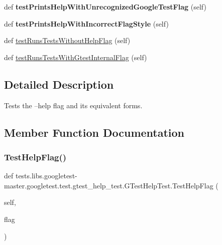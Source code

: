 \begin{DoxyCompactItemize}
def {\bfseries test\+Prints\+Help\+With\+Unrecognized\+Google\+Test\+Flag} (self)
\item 
\mbox{\label{classtests_1_1libs_1_1googletest-master_1_1googletest_1_1test_1_1gtest__help__test_1_1GTestHelpTest_a0c6d51ea37769e7b80b34315f89d1fc4}} 
def {\bfseries test\+Prints\+Help\+With\+Incorrect\+Flag\+Style} (self)
\item 
def \hyperlink{classtests_1_1libs_1_1googletest-master_1_1googletest_1_1test_1_1gtest__help__test_1_1GTestHelpTest_a08c28fbc7aacb80842b29ec41faf3fc8}{test\+Runs\+Tests\+Without\+Help\+Flag} (self)
\item 
def \hyperlink{classtests_1_1libs_1_1googletest-master_1_1googletest_1_1test_1_1gtest__help__test_1_1GTestHelpTest_a5b52935bcda9f8e5aa41c29d38baa161}{test\+Runs\+Tests\+With\+Gtest\+Internal\+Flag} (self)
\end{DoxyCompactItemize}


\subsection{Detailed Description}
\begin{DoxyVerb}Tests the --help flag and its equivalent forms.\end{DoxyVerb}
 

\subsection{Member Function Documentation}
\mbox{\label{classtests_1_1libs_1_1googletest-master_1_1googletest_1_1test_1_1gtest__help__test_1_1GTestHelpTest_a39952f2e367cd1137fb42923e56dcd64}} 
\subsubsection{\texorpdfstring{Test\+Help\+Flag()}{TestHelpFlag()}}
{\footnotesize\ttfamily def tests.\+libs.\+googletest-\/master.\+googletest.\+test.\+gtest\+\_\+help\+\_\+test.\+G\+Test\+Help\+Test.\+Test\+Help\+Flag (\begin{DoxyParamCaption}\item[{}]{self,  }\item[{}]{flag }\end{DoxyParamCaption})}

